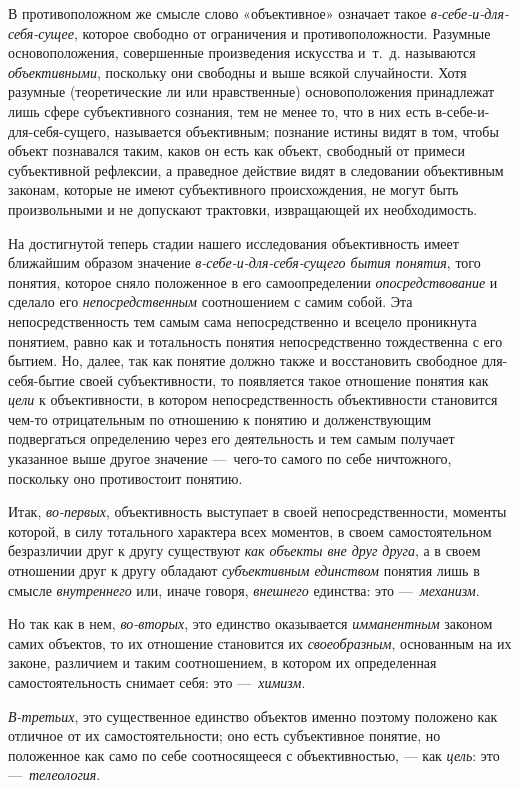 \documentclass[twoside]{article}
\begin{document}
{{{{{{В противоположном же смысле слово «объективное» означает такое
{\em в-себе-и-для-себя-сущее},
которое свободно от ограничения и противоположности. Разумные
основоположения, совершенные произведения искусства и~т.~д. называются
{\em объективными},
поскольку они свободны и выше всякой случайности. Хотя
разумные (теоретические ли или нравственные) основоположения принадлежат
лишь сфере субъективного сознания, тем не менее то, что в них есть
в-себе-и-для-себя-сущего, называется объективным; познание истины видят в
том, чтобы объект познавался таким, каков он есть как объект, свободный от
примеси субъективной рефлексии, а праведное действие видят в следовании
объективным законам, которые не имеют субъективного происхождения, не могут
быть произвольными и не допускают трактовки, извращающей их необходимость.

На достигнутой теперь стадии нашего исследования объективность
имеет ближайшим образом значение
{\em в-себе-и-для-себя-сущего бытия
понятия}, того понятия, которое сняло положенное в его
самоопределении {\em опосредствование}
и сделало его
{\em непосредственным}
соотношением с самим собой. Эта непосредственность тем самым
сама непосредственно и всецело проникнута понятием, равно как и тотальность
понятия непосредственно тождественна с его бытием. Но, далее, так как
понятие должно также и восстановить свободное для-себя-бытие своей
субъективности, то появляется такое отношение понятия как
{\em цели} к
объективности, в котором непосредственность объективности становится чем-то
отрицательным по отношению к понятию и долженствующим подвергаться
определению через его деятельность и тем самым получает указанное выше
другое значение —~чего-то самого по себе ничтожного,
поскольку оно противостоит понятию.

Итак, {\em во-первых},
объективность выступает в своей непосредственности, моменты
которой, в силу тотального характера всех моментов, в своем самостоятельном
безразличии друг к другу существуют
{\em как объекты вне друг друга},
а в своем отношении друг к другу обладают
{\em субъективным единством}
понятия лишь в смысле
{\em внутреннего} или,
иначе говоря, {\em внешнего}
единства: это
—~{\em механизм}.

Но так как в нем,
{\em во-вторых}, это
единство оказывается {\em имманентным}
законом самих объектов, то их отношение становится их
{\em своеобразным},
основанным на их законе, различием и таким соотношением, в
котором их определенная самостоятельность снимает себя: это
—~{\em химизм}.

{\em В-третьих}, это
существенное единство объектов именно поэтому положено как отличное от их
самостоятельности; оно есть субъективное понятие, но положенное как само по
себе соотносящееся с объективностью, — как
{\em цель}: это
—~{\em телеология}.

}}}}}}
\end{document}
